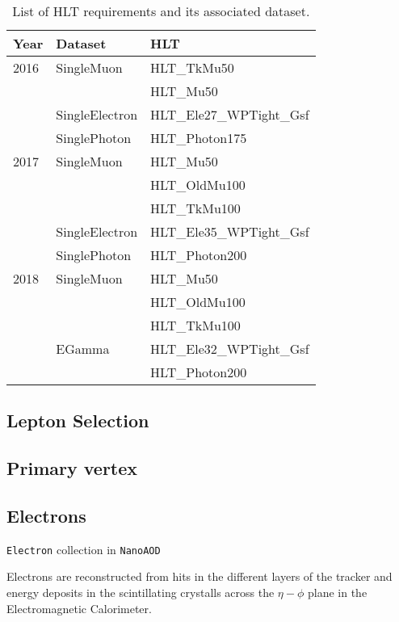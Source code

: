 \begin{table}[h]
\centering
\caption{List of HLT requirements and its associated dataset.}
\begin{tabular}{|l|l|l|}
\hline
Year & Dataset & HLT                \\ \hline
2016 & SingleMuon     & HLT\_TkMu50 \\
     &                & HLT\_Mu50   \\
     & SingleElectron & HLT\_Ele27\_WPTight\_Gsf  \\
     & SinglePhoton   & HLT\_Photon175            \\ \hline
2017 & SingleMuon     & HLT\_Mu50       \\
     &                & HLT\_OldMu100   \\
     &                & HLT\_TkMu100    \\
     & SingleElectron & HLT\_Ele35\_WPTight\_Gsf  \\
     & SinglePhoton   & HLT\_Photon200            \\ \hline
2018 & SingleMuon & HLT\_Mu50     \\
     &            & HLT\_OldMu100 \\
     &            & HLT\_TkMu100  \\ \hline
     & EGamma     & HLT\_Ele32\_WPTight\_Gsf \\
     &            & HLT\_Photon200           \\ \hline
\end{tabular}
\label{tab:Datasets}
\end{table}


\subsection{Lepton Selection}

\subsection{Primary vertex}

\subsection{Electrons}

\verb|Electron| collection in \verb|NanoAOD|

Electrons are reconstructed from hits in the different
layers of the tracker and energy deposits in the scintillating crystalls
across the $\eta-\phi$ plane in the Electromagnetic Calorimeter.

